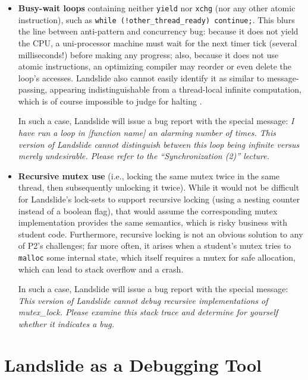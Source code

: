\begin{itemize}
	\item {\bf Busy-wait loops} containing neither {\tt yield} nor {\tt xchg} (nor any other atomic instruction), such as {\tt while (!other\_thread\_ready) continue;}.
		This blurs the line between anti-pattern and concurrency bug:
		because it does not yield the CPU, a uni-processor machine must wait for the next timer tick (several milliseconds!) before making any progress;
		also, because it does not use atomic instructions, an optimizing compiler may reorder or even delete the loop's accesses.
		Landslide also cannot easily identify it as similar to message-passing,
		appearing indistinguishable
		from a thread-local infinite computation,
		which is of course impossible to judge for halting \cite{entscheidungsproblem}.

		In such a case, Landslide will issue a bug report with the special message:
		{\em I have run a loop in [function name] an alarming number of times.
		This version of Landslide cannot distinguish between this loop being infinite versus merely undesirable.
		Please refer to the ``Synchronization (2)'' lecture.}
	\item {\bf Recursive mutex use} (i.e., locking the same mutex twice in the same thread, then subsequently unlocking it twice).
		While it would not be difficult for Landslide's lock-sets to support recursive locking (using a nesting counter instead of a boolean flag),
		that would assume the corresponding mutex implementation provides the same semantics,
		which is risky business with student code. %
		Furthermore, recursive locking is not an obvious solution to any of P2's challenges;
		far more often, it arises when a student's mutex tries to {\tt malloc} some internal state,
		which itself requires a mutex for safe allocation, which can lead to stack overflow and a crash.

		In such a case, Landslide will issue a bug report with the special message:
		{\em This version of Landslide cannot debug recursive implementations of mutex\_lock.
		Please examine this stack trace and determine for yourself whether it indicates a bug.}
\end{itemize}

\section{Landslide as a Debugging Tool}
\label{sec:studence}

